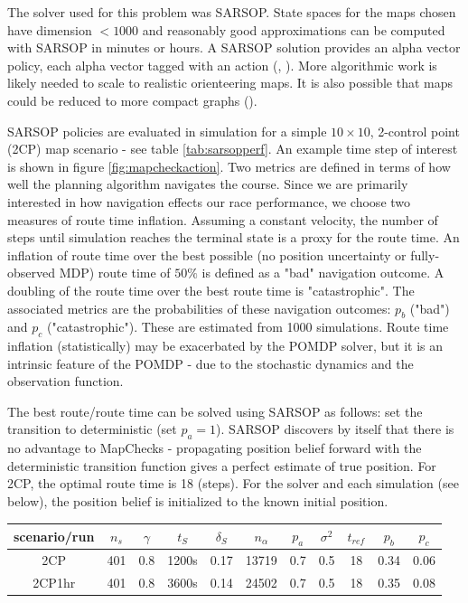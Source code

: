 \documentclass[twoside,11pt]{article}
\begin{document}
The solver used for this problem was SARSOP. State spaces for the maps chosen have dimension $< 1000$ and reasonably good approximations can be computed with SARSOP in minutes or hours. A SARSOP solution provides an alpha vector policy, each alpha vector tagged with an action (\cite{Kochenderfer2022}, \cite{Kurniawati-RSS08}). More algorithmic work is likely needed to scale to realistic orienteering maps. It is also possible that maps could be reduced to more compact graphs (\cite{figop}).

SARSOP policies are evaluated in simulation for a simple $10 \times 10$, 2-control point (2CP) map scenario - see  table \ref{tab:sarsopperf}. An example time step of interest is shown in figure \ref{fig:mapcheckaction}. Two metrics are defined in terms of how well the planning algorithm navigates the course. Since we are primarily interested in how navigation effects our race performance, we choose two measures of route time inflation. Assuming a constant velocity, the number of steps until simulation reaches the terminal state is a proxy for the route time. An inflation of route time over the best possible (no position uncertainty or fully-observed MDP) route time of $50\%$ is defined as a "bad" navigation outcome. A doubling of the route time over the best route time is "catastrophic". The associated metrics are the probabilities of these navigation outcomes: $p_b$ ("bad") and $p_c$ ("catastrophic"). These are estimated from 1000 simulations. Route time inflation (statistically) may be exacerbated by the POMDP solver, but it is an intrinsic feature of the POMDP - due to the stochastic dynamics and the observation function.

The best route/route time can be solved using SARSOP as follows: set the transition to deterministic (set $p_a = 1$). SARSOP discovers by itself that there is no advantage to MapChecks - propagating position belief forward with the deterministic transition function gives a perfect estimate of true position. For 2CP, the optimal route time is 18 (steps). For the solver and each simulation (see below), the position belief is initialized to the known initial position. 

\vspace{10pt}
\begin{center}
	\begin{tabular}{|c|c|c|c|c|c|c|c|c|c|c|}
	    \hline
	    \textbf{scenario/run} & $n_s$ & $\gamma$ & $t_S$ & $\delta_S$ & $n_{\alpha}$ &
	     $p_a$ & $\sigma^2$ & $t_{ref}$ & $p_b$ & $p_c$ \\
	    \hline\hline
	    2CP & 401 & 0.8 & 1200s & 0.17 & 13719 & 0.7 & 0.5 & 18 & 0.34 & 0.06\\
	    2CP1hr & 401 & 0.8 & 3600s & 0.14 & 24502 & 0.7 & 0.5 & 18 & 0.35 & 0.08 \\
	    \hline
	\end{tabular}
	\label{tab:sarsopperf}
\end{center}
\end{document}

